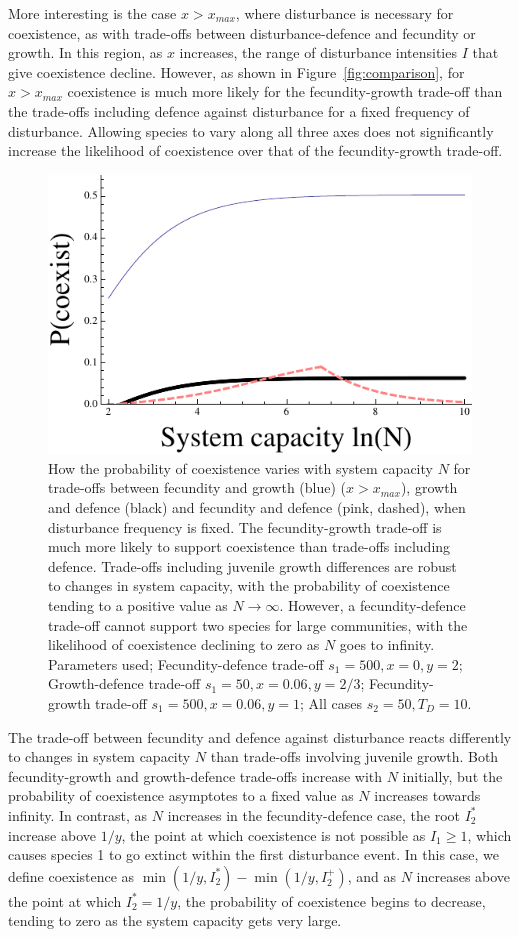\documentclass[a4paper]{article}
\begin{document}
More interesting is the case $x>x_{max}$, where disturbance is necessary for coexistence, as with trade-offs between disturbance-defence and fecundity or growth. In this region, as $x$ increases, the range of disturbance intensities $I$ that give coexistence decline. However, as shown in Figure~\ref{fig:comparison}, for $x>x_{max}$ coexistence is much more likely for the fecundity-growth trade-off than the trade-offs including defence against disturbance for a fixed frequency of disturbance. Allowing species to vary along all three axes does not significantly increase the likelihood of coexistence over that of the fecundity-growth trade-off.
\begin{figure}
  \includegraphics[width=4.5in]{Systemsizechanges.pdf}
   \caption{How the probability of coexistence varies with system capacity $N$ for trade-offs between fecundity and growth (blue) ($x>x_{max}$), growth and defence (black) and fecundity and defence (pink, dashed), when disturbance frequency is fixed. The fecundity-growth trade-off is much more likely to support coexistence than trade-offs including defence. Trade-offs including juvenile growth differences are robust to changes in system capacity, with the probability of coexistence tending to a positive value as $N \to \infty$. However, a fecundity-defence trade-off cannot support two species for large communities, with the likelihood of coexistence declining to zero as $N$ goes to infinity. Parameters used; Fecundity-defence trade-off $s_1=500,x=0,y=2$; Growth-defence trade-off $s_1=50,x=0.06,y=2/3$; Fecundity-growth trade-off $s_1=500,x=0.06,y=1$; All cases $s_2=50, T_D=10$.}
 \label{fig:systemsize}
\end{figure}
The trade-off between fecundity and defence against disturbance reacts differently to changes in system capacity $N$ than trade-offs involving juvenile growth. Both fecundity-growth and growth-defence trade-offs increase with $N$ initially, but the probability of coexistence asymptotes to a fixed value as $N$ increases towards infinity. In contrast, as $N$ increases in the fecundity-defence case, the root $I_2^*$ increase above $1/y$, the point at which coexistence is not possible as $I_1 \geq 1$, which causes species 1 to go extinct within the first disturbance event. In this case, we define coexistence as $\min(1/y,I_2^*) - \min(1/y,I_2^+)$, and as $N$ increases above the point at which $I_2^*=1/y$, the probability of coexistence begins to decrease, tending to zero as the system capacity gets very large.
\end{document}
